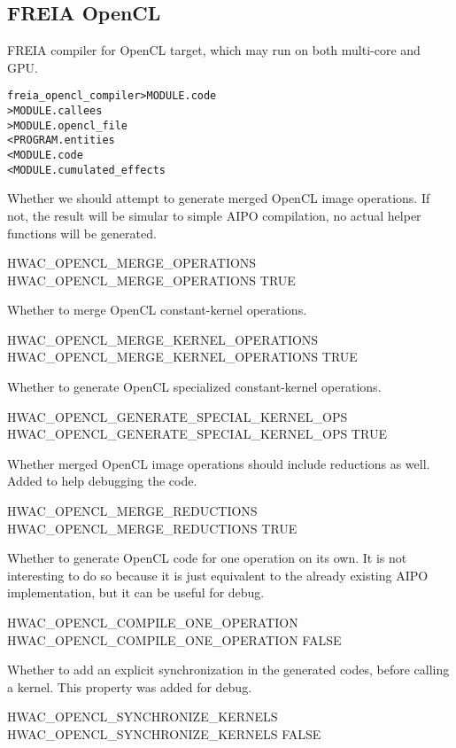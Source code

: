 \documentclass[a4paper]{report}
\newenvironment{PipsMake}{\begin{alltt}}{\end{alltt}}
\begin{document}
\subsection{FREIA OpenCL}
\label{hwac-freia-opencl}

FREIA compiler for OpenCL target, which may run on both multi-core and GPU.

\begin{PipsMake}
freia_opencl_compiler  > MODULE.code
                       > MODULE.callees
                       > MODULE.opencl_file
        < PROGRAM.entities
        < MODULE.code
        < MODULE.cumulated_effects
\end{PipsMake}

Whether we should attempt to generate merged OpenCL image operations.
If not, the result will be simular to simple AIPO compilation,
no actual helper functions will be generated.
\begin{PipsProp}{HWAC_OPENCL_MERGE_OPERATIONS}
HWAC_OPENCL_MERGE_OPERATIONS TRUE
\end{PipsProp}

Whether to merge OpenCL constant-kernel operations.
\begin{PipsProp}{HWAC_OPENCL_MERGE_KERNEL_OPERATIONS}
HWAC_OPENCL_MERGE_KERNEL_OPERATIONS TRUE
\end{PipsProp}

Whether to generate OpenCL specialized constant-kernel operations.
\begin{PipsProp}{HWAC_OPENCL_GENERATE_SPECIAL_KERNEL_OPS}
HWAC_OPENCL_GENERATE_SPECIAL_KERNEL_OPS TRUE
\end{PipsProp}

Whether merged OpenCL image operations should include reductions as well.
Added to help debugging the code.
\begin{PipsProp}{HWAC_OPENCL_MERGE_REDUCTIONS}
HWAC_OPENCL_MERGE_REDUCTIONS TRUE
\end{PipsProp}

Whether to generate OpenCL code for one operation on its own.
It is not interesting to do so because it is just equivalent to
the already existing AIPO implementation, but it can be useful for
debug.
\begin{PipsProp}{HWAC_OPENCL_COMPILE_ONE_OPERATION}
HWAC_OPENCL_COMPILE_ONE_OPERATION FALSE
\end{PipsProp}

Whether to add an explicit synchronization in the generated codes,
before calling a kernel. This property was added for debug.
\begin{PipsProp}{HWAC_OPENCL_SYNCHRONIZE_KERNELS}
HWAC_OPENCL_SYNCHRONIZE_KERNELS FALSE
\end{PipsProp}
\end{document}
